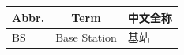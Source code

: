 
\begin{longtable}{|p{}|p{}|p{}|}
  \hline
  \multicolumn{1}{|c|}{Abbr.} & \multicolumn{1}{c|}{Term} & \multicolumn{1}{c|}{中文全称} \\ \hline
  BS & Base Station & 基站 \\ \hline  
\end{longtable}

